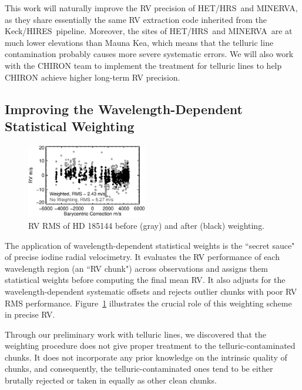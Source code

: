 \documentclass[12pt]{article}
\def\minerva{MINERVA}
\def\hrs{HET/HRS}
\def\keck{Keck/HIRES}
\begin{document}
This work will naturally improve the RV precision of \hrs\ and
\minerva, as they share essentially the same RV extraction code
inherited from the \keck\ pipeline. Moreover, the sites of \hrs\ and
\minerva\ are at much lower elevations than Mauna Kea, which means
that the telluric line contamination probably causes more severe
systematic errors. We will also work with the CHIRON team to implement
the treatment for telluric lines to help CHIRON achieve higher
long-term RV precision.


\vspace{-3pt}
\subsection{Improving the Wavelength-Dependent Statistical Weighting}\label{sec:vank}


\begin{figure}
  \vspace{-35pt}
  \begin{center}
    \includegraphics[width=0.47\textwidth]{vank}
  \end{center}
  \vspace{-25pt}  
  \caption{RV RMS of HD 185144 before (gray) and after (black) weighting.} 
  \vspace{-8pt}  
  \label{fig:vank}
\end{figure}

The application of wavelength-dependent statistical weights is the
``secret sauce" of precise iodine radial velocimetry. It evaluates the
RV performance of each wavelength region (an ``RV chunk") across
observations and assigns them statistical weights before computing the
final mean RV. It also adjusts for the wavelength-dependent systematic
offsets and rejects outlier chunks with poor RV RMS
performance. Figure~\ref{fig:vank} illustrates the crucial role of
this weighting scheme in precise RV.

Through our preliminary work with telluric lines, we discovered that
the weighting procedure does not give proper treatment to the
telluric-contaminated chunks. It does not incorporate any prior
knowledge on the intrinsic quality of chunks, and consequently, the
telluric-contaminated ones tend to be either brutally rejected or
taken in equally as other clean chunks.
\end{document}
